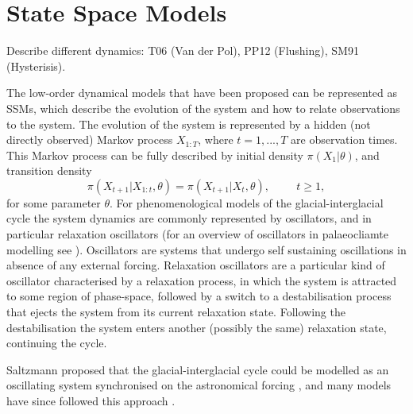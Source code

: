 \documentclass[a4paper,12pt]{article}
\begin{document}
\color{gray}
\section{State Space Models}
\label{Sec:Models}
Describe different dynamics: T06 (Van der Pol), PP12 (Flushing), SM91 (Hysterisis).


The low-order dynamical models that have been proposed can be represented as SSMs, which describe the evolution of the system and how to relate observations to the system.
The evolution of the system is represented by a hidden (not directly observed) Markov process $X_{1:T}$, where $t=1,...,T$ are observation times.
This Markov process can be fully described by initial density $\pi (X_1 \vert \theta)$, and transition density
\begin{equation}
\pi (X_{t+1} \vert X_{1:t}, \theta) = \pi (X_{t+1} \vert X_t, \theta), \hspace{1cm} t \geq 1 ,
\end{equation}
\noindent for some parameter $\theta$.
For phenomenological models of the glacial-interglacial cycle the system dynamics are commonly represented by oscillators, and in particular relaxation oscillators (for an overview of oscillators in palaeocliamte modelling see \cite{Crucifix2012}).
Oscillators are systems that undergo self sustaining oscillations in absence of any external forcing.
Relaxation oscillators are a particular kind of oscillator characterised by a relaxation process, in which the system is attracted to some region of phase-space, followed by a switch to a destabilisation process that ejects the system from its current relaxation state.
Following the destabilisation the system enters another (possibly the same) relaxation state, continuing the cycle.


Saltzmann proposed that the glacial-interglacial cycle could be modelled as an oscillating system synchronised on the astronomical forcing \cite{Saltzman1990,Saltzman1991}, and many models have since followed this approach \cite{Crucifix2012,Crucifix2013}.
\end{document}
